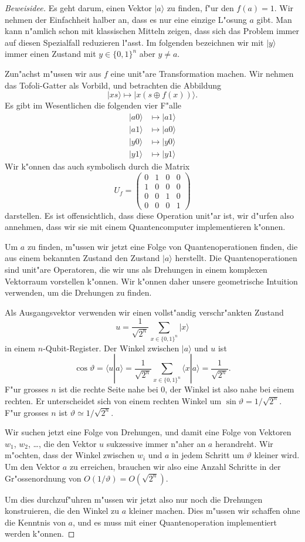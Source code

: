 \begin{proof}[Beweisidee]
Es geht darum, einen Vektor $|a\rangle$ zu finden, f"ur den $f(a)=1$.
Wir nehmen der Einfachheit halber an, dass es nur eine einzige L"osung $a$
gibt.
Man kann n"amlich schon mit klassischen Mitteln zeigen, dass sich das
Problem immer auf diesen Spezialfall reduzieren l"asst.
Im folgenden bezeichnen wir mit $|y\rangle$ immer einen Zustand mit
$y\in\{0,1\}^n$ aber $y\ne a$.

Zun"achst m"ussen wir aus $f$ eine unit"are Transformation machen.
Wir nehmen das Tofoli-Gatter als Vorbild, und betrachten die Abbildung
\[
|x s\rangle \mapsto |x (s\oplus f(x))\rangle.
\]
Es gibt im Wesentlichen die folgenden vier F"alle
\begin{align*}
|a0\rangle&\mapsto |a1\rangle\\
|a1\rangle&\mapsto |a0\rangle\\
|y0\rangle&\mapsto |y0\rangle\\
|y1\rangle&\mapsto |y1\rangle
\end{align*}
Wir k"onnen das auch symbolisch durch die Matrix
\[
U_f
=
\begin{pmatrix}
0&1&0&0\\
1&0&0&0\\
0&0&1&0\\
0&0&0&1
\end{pmatrix}
\]
darstellen. Es ist offensichtlich, dass diese Operation unit"ar ist, 
wir d"urfen also annehmen, dass wir sie mit einem Quantencomputer
implementieren k"onnen.

Um $a$ zu finden, m"ussen wir jetzt eine Folge von Quantenoperationen
finden, die aus einem bekannten Zustand den Zustand $|a\rangle$ herstellt.
Die Quantenoperationen sind unit"are Operatoren, die wir uns als Drehungen
in einem komplexen Vektorraum vorstellen k"onnen.
Wir k"onnen daher unsere geometrische Intuition verwenden, um die Drehungen
zu finden.

Als Ausgangsvektor verwenden wir einen vollst"andig verschr"ankten Zustand
\[
u=\frac1{\sqrt{2^n}}\sum_{x\in\{0,1\}^n}|x\rangle
\]
in einem $n$-Qubit-Register.
Der Winkel zwischen $|a\rangle$ und $u$ ist
\[
\cos\vartheta
=
\langle u|a\rangle
=
\frac1{\sqrt{2^n}}
\sum_{x\in\{0,1\}^n}\langle x|a\rangle
=
\frac1{\sqrt{2^n}}.
\]
F"ur grosses $n$ ist die rechte Seite nahe bei $0$, der Winkel ist
also nahe bei einem rechten.
Er unterscheidet sich von einem rechten Winkel um
$\sin\vartheta=1/{\sqrt{2^n}}$.
F"ur grosses $n$ ist $\vartheta\simeq 1/{\sqrt{2^n}}$.

Wir suchen jetzt eine Folge von Drehungen, und damit
eine Folge von Vektoren $w_1$, $w_2$, \dots, die den Vektor $u$ sukzessive
immer n"aher an $a$ herandreht.
Wir m"ochten, dass der Winkel zwischen $w_i$ und $a$ in jedem Schritt 
um $\vartheta$ kleiner wird.
Um den Vektor $a$ zu erreichen, brauchen wir also eine Anzahl Schritte
in der Gr"ossenordnung von $O(1/\vartheta)=O(\sqrt{2^n})$.

Um dies durchzuf"uhren m"ussen wir jetzt also nur noch die Drehungen
konstruieren, die den Winkel zu $a$ kleiner machen.
Dies m"ussen wir schaffen ohne die Kenntnis von $a$, und es muss mit
einer Quantenoperation implementiert werden k"onnen.
\end{proof}

